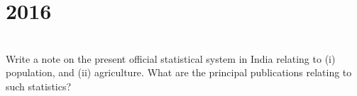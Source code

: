 \section*{2016}
\vspace{-.5cm}
\hrulefill \smallskip\\
 Write a note on the present official statistical system in India relating to (i) population, and (ii) agriculture. What are the principal publications relating to such statistics?
